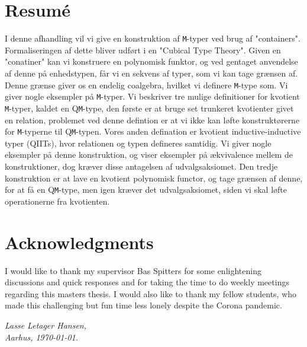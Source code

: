 \documentclass[twoside,11pt,openright]{report}
\theoremstyle{plain} %
\theoremstyle{definition}
\theoremstyle{remark}
\begin{document}
\chapter*{Resum\'e}

I denne afhandling vil vi give en konstruktion af \texttt{M}-typer ved brug af "containers". Formaliseringen af dette bliver udført i en "Cubical Type Theory". Given en "conatiner" kan vi konstruere en polynomisk funktor, og ved gentaget anvendelse af denne på enhedstypen, får vi en sekvens af typer, som vi kan tage grænsen af. Denne grænse giver os en endelig coalgebra, hvilket vi definere \texttt{M}-type som. Vi giver nogle eksempler på \texttt{M}-typer. Vi beskriver tre mulige definitioner for kvotient \texttt{M}-typer, kaldet en Q\texttt{M}-type, den første er at bruge set trunkeret kvotienter givet en relation, problemet ved denne defintion er at vi ikke kan løfte konstruktørerne for \texttt{M}-typerne til Q\texttt{M}-typen. Vores anden defination er kvotient inductive-inductive typer (QIITs), hvor relationen og typen defineres samtidig. Vi giver nogle eksempler på denne konstruktion, og viser eksempler på ækvivalence mellem de konstruktioner, dog kræver disse antagelsen af udvalgsaksiomet. Den tredje konstruktion er at lave en kvotient polynomisk functor, og tage grænsen af denne, for at få en Q\texttt{M}-type, men igen kræver det udvalgsaksiomet, siden vi skal løfte operationerne fra kvotienten. 

\chapter*{Acknowledgments}
I would like to thank my supervisor Bas Spitters for some enlightening discussions and quick responses and for taking the time to do weekly meetings regarding this masters thesis. I would also like to thank my fellow students, who made this challenging but fun time less lonely despite the Corona pandemic.
\vspace{2ex}
\begin{flushright}
  \emph{Lasse Letager Hansen,}\\
  \emph{Aarhus, \today.}
\end{flushright}

\tableofcontents
\cleardoublepage
{}
\setcounter{secnumdepth}{3} %

\end{document}
